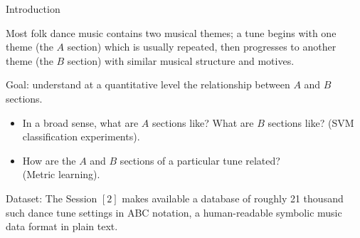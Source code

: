 \documentclass[letterpaper]{amsart}
\begin{document}
\begin{center}
\Huge
Introduction
\end{center}
\huge

Most folk dance music contains two musical themes; a tune begins with one theme (the $A$ section) which is usually repeated, then progresses to another theme (the $B$ section) with similar musical structure and motives.

Goal: understand at a quantitative level the relationship between $A$ and $B$ sections.
\begin{itemize}
\item In a broad sense, what are $A$ sections like? What are $B$ sections like? (SVM classification experiments).

\item How are the $A$ and $B$ sections of a particular tune related? \\(Metric learning).
\end{itemize}

Dataset: The Session $[2]$ makes available a database of roughly 21 thousand such dance tune settings in ABC notation, a human-readable symbolic music data format in plain text.
\end{document}
